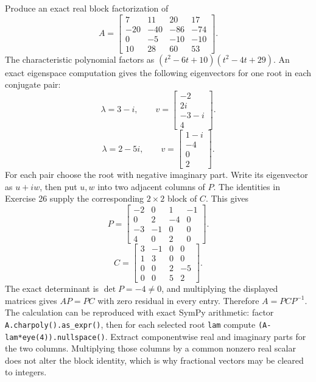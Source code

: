 \goal Produce an exact real block factorization of
\[A=\begin{bmatrix}7&11&20&17\\-20&-40&-86&-74\\0&-5&-10&-10\\10&28&60&53\end{bmatrix}.\]
The characteristic polynomial factors as $\left(t^{2} - 6 t + 10\right) \left(t^{2} - 4 t + 29\right)$. An exact eigenspace computation gives the following eigenvectors for one root in each conjugate pair:
\[\lambda=3 - i,\qquad v=\begin{bmatrix}-2\\2 i\\-3 - i\\4\end{bmatrix}.\]
\[\lambda=2 - 5 i,\qquad v=\begin{bmatrix}1 - i\\-4\\0\\2\end{bmatrix}.\]
For each pair choose the root with negative imaginary part. Write its eigenvector as $u+iw$, then put $u,w$ into two adjacent columns of $P$. The identities in Exercise 26 supply the corresponding $2\times2$ block of $C$. This gives
\[P=\begin{bmatrix}-2&0&1&-1\\0&2&-4&0\\-3&-1&0&0\\4&0&2&0\end{bmatrix}.\]
\[C=\begin{bmatrix}3&-1&0&0\\1&3&0&0\\0&0&2&-5\\0&0&5&2\end{bmatrix}.\]
The exact determinant is $\det P=-4\ne0$, and multiplying the displayed matrices gives $AP=PC$ with zero residual in every entry. Therefore $A=PCP^{-1}$.
The calculation can be reproduced with exact SymPy arithmetic: factor \texttt{A.charpoly().as\_expr()}, then for each selected root \texttt{lam} compute \texttt{(A-lam*eye(4)).nullspace()}. Extract componentwise real and imaginary parts for the two columns. Multiplying those columns by a common nonzero real scalar does not alter the block identity, which is why fractional vectors may be cleared to integers.

